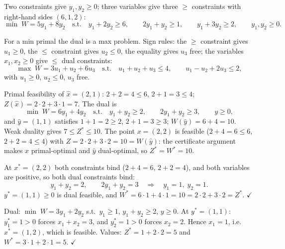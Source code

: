 \begin{solutions}
  \item Two constraints give $y_{1},y_{2}\ge 0$; three variables give
        three $\ge$ constraints with right-hand sides $(6,1,2)$:
        \[
          \min\; W=5y_{1}+8y_{2}
          \quad\text{s.t.}\quad
          y_{1}+2y_{2}\ge 6,\qquad
          2y_{1}+y_{2}\ge 1,\qquad
          y_{1}+3y_{2}\ge 2,\qquad
          y_{1},y_{2}\ge 0 .
        \]

  \item For a min primal the dual is a max problem. Sign rules: the
        $\ge$ constraint gives $u_{1}\ge 0$, the $\le$ constraint gives
        $u_{2}\le 0$, the equality gives $u_{3}$ free; the variables
        $x_{1},x_{2}\ge 0$ give $\le$ dual constraints:
        \[
          \max\; W=3u_{1}+u_{2}+6u_{3}
          \quad\text{s.t.}\quad
          u_{1}+u_{2}+u_{3}\le 4,\qquad
          u_{1}-u_{2}+2u_{3}\le 2,
        \]
        with $u_{1}\ge 0$, $u_{2}\le 0$, $u_{3}$ free.

  \item Primal feasibility of $\hat{x}=(2,1)$: $2+2=4\le 6$,
        $2+1=3\le 4$; $Z(\hat{x})=2\cdot 2+3\cdot 1=7$. The dual is
        \[
          \min\; W=6y_{1}+4y_{2}
          \quad\text{s.t.}\quad
          y_{1}+y_{2}\ge 2,\qquad 2y_{1}+y_{2}\ge 3,\qquad y\ge 0,
        \]
        and $\hat{y}=(1,1)$ satisfies $1+1=2\ge 2$, $2+1=3\ge 3$;
        $W(\hat{y})=6+4=10$. Weak duality gives $7\le Z^{*}\le 10$.
        The point $x=(2,2)$ is feasible ($2+4=6\le 6$, $2+2=4\le 4$)
        with $Z=2\cdot 2+3\cdot 2=10=W(\hat{y})$: the certificate
        argument makes $x$ primal-optimal and $\hat{y}$ dual-optimal,
        so $Z^{*}=W^{*}=10$.

  \item At $x^{*}=(2,2)$ both constraints bind ($2+4=6$, $2+2=4$), and
        both variables are positive, so both dual constraints bind:
        \[
          y_{1}+y_{2}=2,\qquad 2y_{1}+y_{2}=3
          \quad\Longrightarrow\quad y_{1}=1,\; y_{2}=1 .
        \]
        $y^{*}=(1,1)\ge 0$ is dual feasible, and
        $W^{*}=6\cdot 1+4\cdot 1=10=2\cdot 2+3\cdot 2=Z^{*}$.
        $\checkmark$

  \item Dual:
        $\min\; W=3y_{1}+2y_{2}$ s.t.\ $y_{1}\ge 1$,
        $y_{1}+y_{2}\ge 2$, $y\ge 0$. At $y^{*}=(1,1)$:
        $y_{1}^{*}=1>0$ forces $x_{1}+x_{2}=3$, and $y_{2}^{*}=1>0$
        forces $x_{2}=2$. Hence $x_{1}=1$, i.e.\ $x^{*}=(1,2)$, which is
        feasible. Values:
        $Z^{*}=1+2\cdot 2=5$ and $W^{*}=3\cdot 1+2\cdot 1=5$.
        $\checkmark$


\end{solutions}
